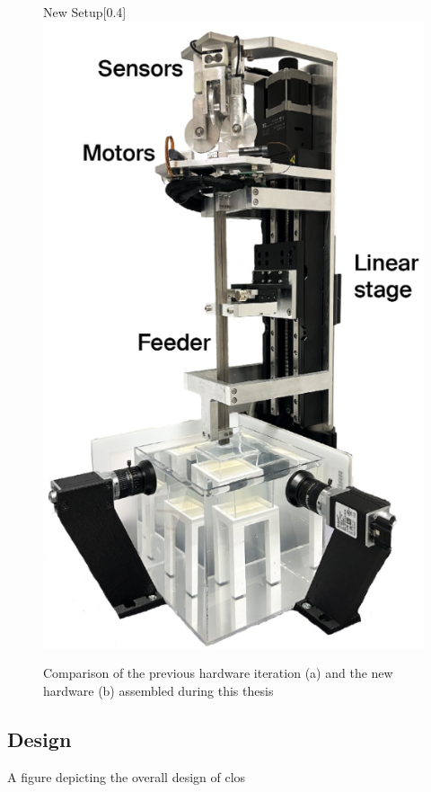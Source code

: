 \begin{figure}[H]
\begin{subcaptionbox}{New Setup\label{fig:right}}[0.4\linewidth]
        {\includegraphics[width=\linewidth]{images/Hardware/insertionStrategy.PNG}}
    \end{subcaptionbox}
    \caption{Comparison of the previous hardware iteration (a) and the new hardware (b) assembled during this thesis}
    \label{fig:hardwarecompare}
\end{figure}


\subsection{Design}
A figure depicting the overall design of clos



